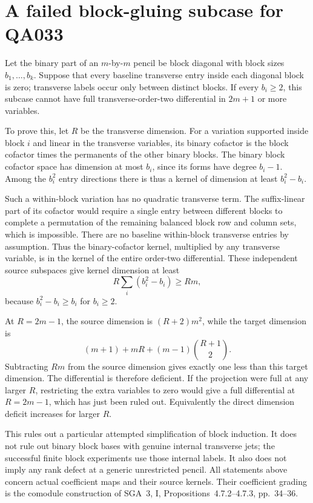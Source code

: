 \section{A failed block-gluing subcase for QA033}

Let the binary part of an \(m\)-by-\(m\) pencil be
block diagonal with block sizes \(b_1,\ldots,b_k\).
Suppose that every baseline transverse entry inside
each diagonal block is zero; transverse labels occur
only between distinct blocks. If every \(b_i\geq2\),
this subcase cannot have full transverse-order-two
differential in \(2m+1\) or more variables.

To prove this, let \(R\) be the transverse dimension.
For a variation supported inside block \(i\) and
linear in the transverse variables, its binary
cofactor is the block cofactor times the permanents
of the other binary blocks.
The binary block cofactor space has dimension at
most \(b_i\), since its forms have degree \(b_i-1\).
Among the \(b_i^2\) entry directions there is thus
a kernel of dimension at least \(b_i^2-b_i\).

Such a within-block variation has no quadratic
transverse term. The suffix-linear part of its
cofactor would require a single entry between
different blocks to complete a permutation of the
remaining balanced block row and column sets,
which is impossible. There are no baseline
within-block transverse entries by assumption.
Thus the binary-cofactor kernel, multiplied by
any transverse variable, is in the kernel of the
entire order-two differential. These independent
source subspaces give kernel dimension at least
\[
                    R\sum_i(b_i^2-b_i)\geq Rm,
\]
because \(b_i^2-b_i\geq b_i\) for \(b_i\geq2\).

At \(R=2m-1\), the source dimension is
\((R+2)m^2\), while the target dimension is
\[
                  (m+1)+mR+(m-1)\binom{R+1}{2}.
\]
Subtracting \(Rm\) from the source dimension gives
exactly one less than this target dimension.
The differential is therefore deficient.
If the projection were full at any larger \(R\),
restricting the extra variables to zero would
give a full differential at \(R=2m-1\), which
has just been ruled out. Equivalently the direct
dimension deficit increases for larger \(R\).

This rules out a particular attempted simplification
of block induction. It does not rule out binary
block bases with genuine internal transverse jets;
the successful finite block experiments use those
internal labels. It also does not imply any rank
defect at a generic unrestricted pencil.
All statements above concern actual coefficient
maps and their source kernels. Their coefficient
grading is the comodule construction of SGA~3,
I, Propositions~4.7.2--4.7.3, pp.~34--36.
